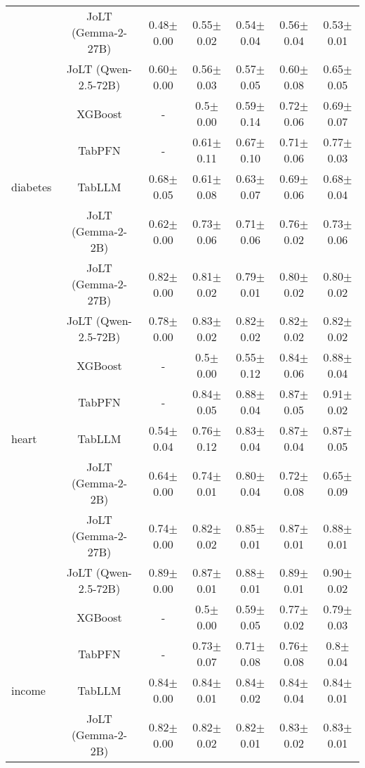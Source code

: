 \begin{table*}[htbp]
\begin{small}
\begin{sc}
\begin{adjustbox}{max width=\textwidth}
\begin{tabular}{rcccccc}
          & JoLT (Gemma-2-27B) & 0.48$\pm$0.00 & 0.55$\pm$0.02 & 0.54$\pm$0.04 & 0.56$\pm$0.04 & 0.53$\pm$0.01 \\
          & JoLT (Qwen-2.5-72B) & 0.60$\pm$0.00 & 0.56$\pm$0.03 & 0.57$\pm$0.05 & 0.60$\pm$0.08 & 0.65$\pm$0.05 \\
    \midrule
          & XGBoost & -     & 0.5$\pm$0.00 & 0.59$\pm$0.14 & 0.72$\pm$0.06 & 0.69$\pm$0.07 \\
          & TabPFN & -     & 0.61$\pm$0.11 & 0.67$\pm$0.10 & 0.71$\pm$0.06 & 0.77$\pm$0.03 \\
    \multicolumn{1}{l}{diabetes} & TabLLM & 0.68$\pm$0.05 & 0.61$\pm$0.08 & 0.63$\pm$0.07 & 0.69$\pm$0.06 & 0.68$\pm$0.04 \\
          & JoLT (Gemma-2-2B) & 0.62$\pm$0.00 & 0.73$\pm$0.06 & 0.71$\pm$0.06 & 0.76$\pm$0.02 & 0.73$\pm$0.06 \\
          & JoLT (Gemma-2-27B) & 0.82$\pm$0.00 & 0.81$\pm$0.02 & 0.79$\pm$0.01 & 0.80$\pm$0.02 & 0.80$\pm$0.02 \\
          & JoLT (Qwen-2.5-72B) & 0.78$\pm$0.00 & 0.83$\pm$0.02 & 0.82$\pm$0.02 & 0.82$\pm$0.02 & 0.82$\pm$0.02 \\
    \midrule
          & XGBoost & -     & 0.5$\pm$0.00 & 0.55$\pm$0.12 & 0.84$\pm$0.06 & 0.88$\pm$0.04 \\
          & TabPFN & -     & 0.84$\pm$0.05 & 0.88$\pm$0.04 & 0.87$\pm$0.05 & 0.91$\pm$0.02 \\
    \multicolumn{1}{l}{heart} & TabLLM & 0.54$\pm$0.04 & 0.76$\pm$0.12 & 0.83$\pm$0.04 & 0.87$\pm$0.04 & 0.87$\pm$0.05 \\
          & JoLT (Gemma-2-2B) & 0.64$\pm$0.00 & 0.74$\pm$0.01 & 0.80$\pm$0.04 & 0.72$\pm$0.08 & 0.65$\pm$0.09 \\
          & JoLT (Gemma-2-27B) & 0.74$\pm$0.00 & 0.82$\pm$0.02 & 0.85$\pm$0.01 & 0.87$\pm$0.01 & 0.88$\pm$0.01 \\
          & JoLT (Qwen-2.5-72B) & 0.89$\pm$0.00 & 0.87$\pm$0.01 & 0.88$\pm$0.01 & 0.89$\pm$0.01 & 0.90$\pm$0.02 \\
    \midrule
          & XGBoost & -     & 0.5$\pm$0.00 & 0.59$\pm$0.05 & 0.77$\pm$0.02 & 0.79$\pm$0.03 \\
          & TabPFN & -     & 0.73$\pm$0.07 & 0.71$\pm$0.08 & 0.76$\pm$0.08 & 0.8$\pm$0.04 \\
    \multicolumn{1}{l}{income} & TabLLM & 0.84$\pm$0.00 & 0.84$\pm$0.01 & 0.84$\pm$0.02 & 0.84$\pm$0.04 & 0.84$\pm$0.01 \\
          & JoLT (Gemma-2-2B) & 0.82$\pm$0.00 & 0.82$\pm$0.02 & 0.82$\pm$0.01 & 0.83$\pm$0.02 & 0.83$\pm$0.01 \\

\end{tabular}
\end{adjustbox}
\end{sc}
\end{small}
\end{table*}
